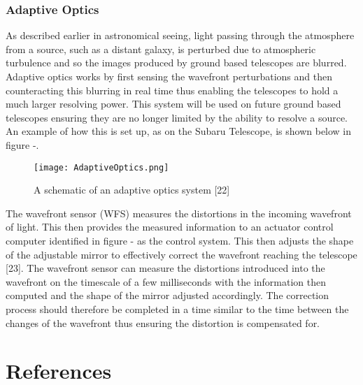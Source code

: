\documentclass[pdf,color]{UoBnote}
\begin{document}
\subsubsection{Adaptive Optics}
As described earlier in astronomical seeing, light passing through the atmosphere from a source, such as a distant galaxy, is perturbed due to atmospheric turbulence and so the images produced by ground based telescopes are blurred. Adaptive optics works by first sensing the wavefront perturbations and then counteracting this blurring in real time thus enabling the telescopes to hold a much larger resolving power. This system will be used on future ground based telescopes ensuring they are no longer limited by the ability to resolve a source. An example of how this is set up, as on the Subaru Telescope, is shown below in figure -. \\
\newline
\newline
\begin{figure}[H]
\begin{center}
\texttt{[image: AdaptiveOptics.png]}
\end{center}
\caption{A schematic of an adaptive optics system [22]}\label{fig:figure1}
\end{figure}
\noindent
The wavefront sensor (WFS) measures the distortions in the incoming wavefront of light. This then provides the measured information to an actuator control computer identified in figure - as the control system. This then adjusts the shape of the adjustable mirror to effectively correct the wavefront reaching the telescope [23].  The wavefront sensor can measure the distortions introduced into the wavefront on the timescale of a few milliseconds with the information then computed and the shape of the mirror adjusted accordingly. The correction process should therefore be completed in a time similar to the time between the changes of the wavefront thus ensuring the distortion is compensated for.\\

\section{References}
\end{document}
